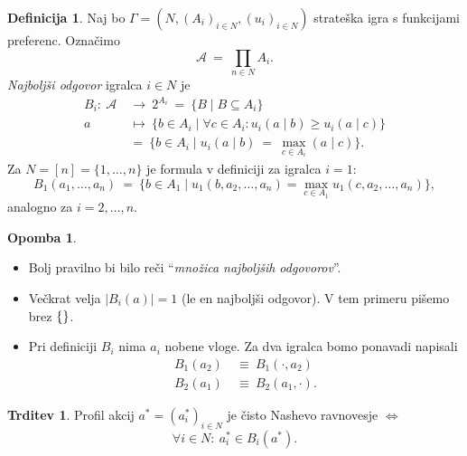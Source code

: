 \documentclass[11pt]{article}
\newcommand{\A}{\mathscr{A}}
\newcommand{\set}[1]{\{#1\}}
\newcommand{\1}{\mathbbm{1}}
\theoremstyle{definition}
\newtheorem{definicija}{Definicija}[section]
\theoremstyle{definition}
\newtheorem{trditev}{Trditev}[section]
\theoremstyle{definition}
\theoremstyle{definition}
\newtheorem*{opomba}{Opomba}
\begin{document}
\pagebreak

\begin{definicija}

Naj bo $\Gamma = (N, (A_i)_{i \in N}, (u_i)_{i \in N})$ strateška igra s funkcijami preferenc. Označimo
$$\A ~=~ \prod_{n \in N} A_i.$$
\textit{Najboljši odgovor} igralca $i \in N$ je 
\begin{align*}
B_i: ~\A ~&\rightarrow~ 2^{A_i} ~=~ \set{B \mid B \subseteq A_i} \\
a ~&\mapsto~ \set{b \in A_i \mid \forall c \in A_i: u_i(a \mid b) \geq u_i(a \mid c)} \\
&=~ \set{b \in A_i \mid u_i(a \mid b) ~=~ \max_{c \in A_i}(a \mid c)}.
\end{align*}
Za $N = [n] = \set{1,\ldots,n}$ je formula v definiciji za igralca $i=1:$
$$B_1(a_1,\ldots,a_n) ~=~ \set{b \in A_1 \mid u_1(b,a_2,\ldots,a_n) = \max_{c \in A_1} u_1(c,a_2,\ldots,a_n)},$$
analogno za $i=2,\ldots,n$.

\end{definicija}
\vspace{0.5cm}

\begin{opomba}
~
\begin{itemize}
	\item Bolj pravilno bi bilo reči ``\textit{množica najboljših odgovorov}''.
	\item Večkrat velja $|B_i(a)|=1$ (le en najboljši odgovor). V tem primeru pišemo brez $\set$.
	\item Pri definiciji $B_i$ nima $a_i$ nobene vloge. Za dva igralca bomo ponavadi napisali
	\begin{align*}
	B_1(a_2) ~&\equiv~ B_1(\cdot,a_2) \\
	B_2(a_1) ~&\equiv~ B_2(a_1,\cdot).
	\end{align*}
\end{itemize}

\end{opomba} 
\vspace{0.5cm}

\begin{trditev}

Profil akcij $a^* = (a_i^*)_{i \in N}$ je čisto Nashevo ravnovesje $\iff$
$$\forall i \in N: ~a_i^* \in B_i(a^*).$$

\end{trditev}
\vspace{0.5cm}

\pagebreak
\end{document}
